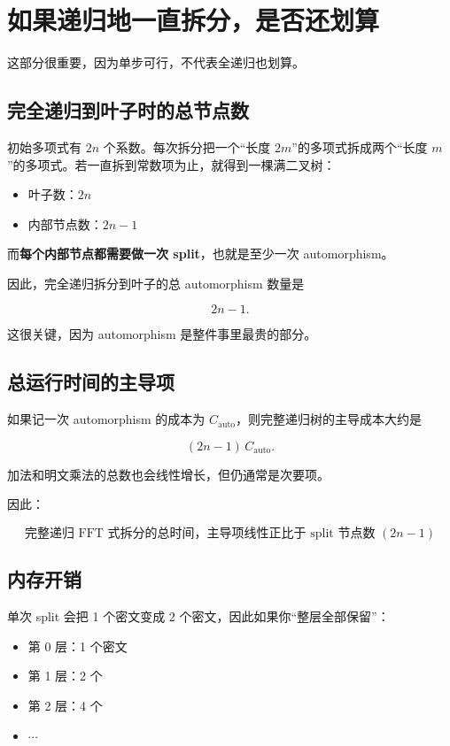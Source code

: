 \documentclass{article}
\begin{document}
\section{如果递归地一直拆分，是否还划算}

这部分很重要，因为单步可行，不代表全递归也划算。

\subsection{完全递归到叶子时的总节点数}

初始多项式有 \(2n\) 个系数。每次拆分把一个“长度 \(2m\)”的多项式拆成两个“长度 \(m\)”的多项式。若一直拆到常数项为止，就得到一棵满二叉树：

\begin{itemize}
    \item 叶子数：\(2n\)
    \item 内部节点数：\(2n-1\)
\end{itemize}

而\textbf{每个内部节点都需要做一次 split}，也就是至少一次 automorphism。

因此，完全递归拆分到叶子的总 automorphism 数量是

\[
2n-1.
\]

这很关键，因为 automorphism 是整件事里最贵的部分。

\subsection{总运行时间的主导项}

如果记一次 automorphism 的成本为 \(C_{\mathrm{auto}}\)，则完整递归树的主导成本大约是

\[
(2n-1)\,C_{\mathrm{auto}}.
\]

加法和明文乘法的总数也会线性增长，但仍通常是次要项。

因此：

\[
\boxed{
\text{完整递归 FFT 式拆分的总时间，主导项线性正比于 split 节点数 }(2n-1)
}
\]

\subsection{内存开销}

单次 split 会把 1 个密文变成 2 个密文，因此如果你“整层全部保留”：

\begin{itemize}
    \item 第 0 层：1 个密文
    \item 第 1 层：2 个
    \item 第 2 层：4 个
    \item \(\cdots\)
\end{itemize}
\end{document}

